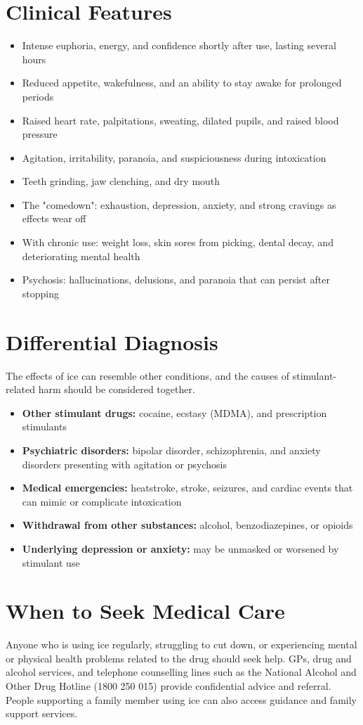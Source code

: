 \section*{Clinical Features}
\begin{itemize}
    \item Intense euphoria, energy, and confidence shortly after use, lasting several hours
    \item Reduced appetite, wakefulness, and an ability to stay awake for prolonged periods
    \item Raised heart rate, palpitations, sweating, dilated pupils, and raised blood pressure
    \item Agitation, irritability, paranoia, and suspiciousness during intoxication
    \item Teeth grinding, jaw clenching, and dry mouth
    \item The "comedown": exhaustion, depression, anxiety, and strong cravings as effects wear off
    \item With chronic use: weight loss, skin sores from picking, dental decay, and deteriorating mental health
    \item Psychosis: hallucinations, delusions, and paranoia that can persist after stopping
\end{itemize}

\section*{Differential Diagnosis}
The effects of ice can resemble other conditions, and the causes of stimulant-related harm should be considered together.
\begin{itemize}
    \item \textbf{Other stimulant drugs:} cocaine, ecstasy (MDMA), and prescription stimulants
    \item \textbf{Psychiatric disorders:} bipolar disorder, schizophrenia, and anxiety disorders presenting with agitation or psychosis
    \item \textbf{Medical emergencies:} heatstroke, stroke, seizures, and cardiac events that can mimic or complicate intoxication
    \item \textbf{Withdrawal from other substances:} alcohol, benzodiazepines, or opioids
    \item \textbf{Underlying depression or anxiety:} may be unmasked or worsened by stimulant use
\end{itemize}

\section*{When to Seek Medical Care}
Anyone who is using ice regularly, struggling to cut down, or experiencing mental or physical health problems related to the drug should seek help. GPs, drug and alcohol services, and telephone counselling lines such as the National Alcohol and Other Drug Hotline (1800 250 015) provide confidential advice and referral. People supporting a family member using ice can also access guidance and family support services.

